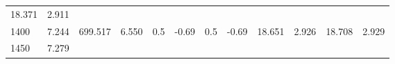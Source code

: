 \documentclass{article}
\begin{document}
\begin{longtable}[]{@{}llllllllllll@{}}
\begin{minipage}[t]{0.06\columnwidth}
18.371\strut
\end{minipage} & \begin{minipage}[t]{0.09\columnwidth}\raggedright\strut
2.911\strut
\end{minipage}\tabularnewline
\begin{minipage}[t]{0.03\columnwidth}\raggedright\strut
1400\strut
\end{minipage} & \begin{minipage}[t]{0.06\columnwidth}\raggedright\strut
7.244\strut
\end{minipage} & \begin{minipage}[t]{0.06\columnwidth}\raggedright\strut
699.517\strut
\end{minipage} & \begin{minipage}[t]{0.08\columnwidth}\raggedright\strut
6.550\strut
\end{minipage} & \begin{minipage}[t]{0.03\columnwidth}\raggedright\strut
0.5\strut
\end{minipage} & \begin{minipage}[t]{0.06\columnwidth}\raggedright\strut
-0.69\strut
\end{minipage} & \begin{minipage}[t]{0.03\columnwidth}\raggedright\strut
0.5\strut
\end{minipage} & \begin{minipage}[t]{0.06\columnwidth}\raggedright\strut
-0.69\strut
\end{minipage} & \begin{minipage}[t]{0.06\columnwidth}\raggedright\strut
18.651\strut
\end{minipage} & \begin{minipage}[t]{0.08\columnwidth}\raggedright\strut
2.926\strut
\end{minipage} & \begin{minipage}[t]{0.06\columnwidth}\raggedright\strut
18.708\strut
\end{minipage} & \begin{minipage}[t]{0.09\columnwidth}\raggedright\strut
2.929\strut
\end{minipage}\tabularnewline
\begin{minipage}[t]{0.03\columnwidth}\raggedright\strut
1450\strut
\end{minipage} & \begin{minipage}[t]{0.06\columnwidth}\raggedright\strut
7.279\strut
\end{minipage} & \begin{minipage}[t]{0.06\columnwidth}\raggedright\strut

\end{minipage}
\end{longtable}
\end{document}
